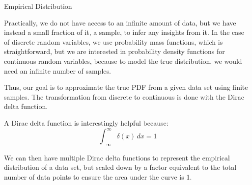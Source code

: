 \begin{intuitbox}{Empirical Distribution}
    

    Practically, we do not have access to an infinite amount of data, but we have instead a small fraction of it, a sample, to infer any insights from it. In the case of discrete random variables, we use probability mass functions, which is straightforward, but we are interested in probability density functions for continuous random variables, because to model the true distribution, we would need an infinite number of samples. \bigskip

    Thus, our goal is to approximate the true PDF from a given data set using finite samples. The transformation from discrete to continuous is done with the Dirac delta function.\\ \bigskip

    A Dirac delta function is interestingly helpful because:
    \[
    \int_{-\infty}^{\infty} \delta(x) \, dx = 1
    \]

    We can then have multiple Dirac delta functions to represent the empirical distribution of a data set, but scaled down by a factor equivalent to the total number of data points to ensure the area under the curve is 1.\\


\end{intuitbox}
